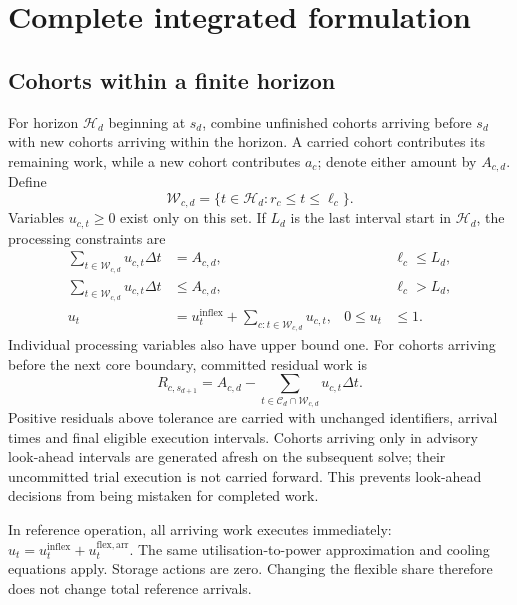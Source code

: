 \section{Complete integrated formulation}
\subsection{Cohorts within a finite horizon}
For horizon $\mathcal H_d$ beginning at $s_d$, combine unfinished cohorts arriving before $s_d$ with new cohorts arriving within the horizon. A carried cohort contributes its remaining work, while a new cohort contributes $a_c$; denote either amount by $A_{c,d}$. Define
\begin{equation}
\mathcal W_{c,d}=\{t\in\mathcal H_d:r_c\leq t\leq\ell_c\}.
\end{equation}
Variables $u_{c,t}\geq0$ exist only on this set. If $L_d$ is the last interval start in $\mathcal H_d$, the processing constraints are
\begin{align}
\sum_{t\in\mathcal W_{c,d}}u_{c,t}\Delta t&=A_{c,d},&&\ell_c\leq L_d,\\
\sum_{t\in\mathcal W_{c,d}}u_{c,t}\Delta t&\leq A_{c,d},&&\ell_c>L_d,\\
u_t&=u_t^{\mathrm{inflex}}+\sum_{c:t\in\mathcal W_{c,d}}u_{c,t},&0\leq u_t&\leq1.
\end{align}
Individual processing variables also have upper bound one. For cohorts arriving before the next core boundary, committed residual work is
\begin{equation}
R_{c,s_{d+1}}=A_{c,d}-\sum_{t\in\mathcal C_d\cap\mathcal W_{c,d}}u_{c,t}\Delta t.
\end{equation}
Positive residuals above tolerance are carried with unchanged identifiers, arrival times and final eligible execution intervals. Cohorts arriving only in advisory look-ahead intervals are generated afresh on the subsequent solve; their uncommitted trial execution is not carried forward. This prevents look-ahead decisions from being mistaken for completed work.

In reference operation, all arriving work executes immediately: $u_t=u_t^{\mathrm{inflex}}+u_t^{\mathrm{flex,arr}}$. The same utilisation-to-power approximation and cooling equations apply. Storage actions are zero. Changing the flexible share therefore does not change total reference arrivals.


